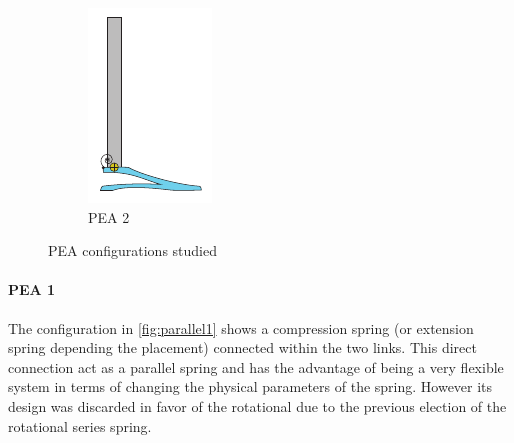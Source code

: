 \begin{figure}[ht!]
\begin{subfigure}{.19\textwidth}
    \includegraphics[width=\linewidth]{figures/illustration_parallel_rotational.pdf}
    \caption{PEA 2}
    \label{fig:parallel2}
  \end{subfigure}
  \caption{PEA configurations studied}
\end{figure}  

\paragraph{PEA 1} %
\label{par:pea_1}
The configuration in \ref{fig:parallel1} shows a compression spring (or extension spring depending the placement) connected within the two links.
This direct connection act as a parallel spring and has the advantage of being a very flexible system in terms of changing the physical parameters of the spring. 
However its design was discarded in favor of the rotational due to the previous election of the rotational series spring.

